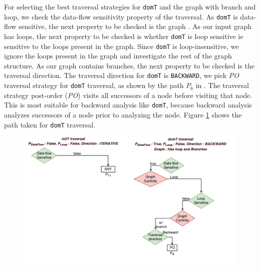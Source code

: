For selecting the best traversal strategies for \lstinline|domT| and the graph
with branch and loop, we check the data-flow sensitivity property of the
traversal.
As \lstinline|domT| is data-flow sensitive, the next property to be checked is
the graph \graphprop{}. As our input graph has loops, the next property to be
checked is whether \lstinline|domT| is loop sensitive ie sensitive to the loops
present in the graph. Since \lstinline|domT| is loop-insensitive, we ignore the
loops present in the graph and investigate the rest of the graph structure. As
our graph contains branches, the next property to be checked is the traversal
direction. The traversal direction for \lstinline|domT| is \lstinline|BACKWARD|,
we pick \textit{PO} traversal strategy for \lstinline|domT| traversal, as shown
by the path $P_6$ in . The traversal strategy
post-order (\textit{PO}) visits all successors of a node before visiting that
node. This is most suitable for backward analysis like \lstinline|domT|, because
backward analysis analyzes successors of a node prior to analyzing the node. Figure \ref{fig:dt-example} shows the path taken for \lstinline|domT| traversal.

\begin{figure}[ht!]
	\centering
	\includegraphics[width=1\linewidth]{tex-figures/initTdomT.pdf}
	\label{fig:dt-example}
\end{figure}


